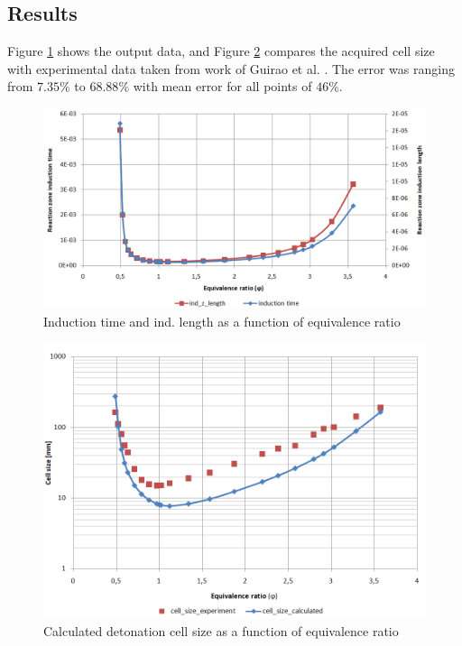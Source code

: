 \documentclass[a4paper]{article}
\begin{document}
\subsection{Results}

Figure \ref{fig:ind_t_and_l} shows the output data, and Figure \ref{fig:ZND_cell_size} compares the acquired cell size with experimental data taken from work of Guirao et al.\cite{Guirao} \cite{DetDat}. The error was ranging from $7.35\%$ to $68.88\%$ with mean error for all points of $46\%$.

\begin{figure}[h!]
\centering
\includegraphics[width=1\textwidth]{1_ind_time_AND_ind_zone_length_against_eq_ratio.PNG}
\caption{\label{fig:ind_t_and_l}Induction time and ind. length as a function of equivalence ratio}
\end{figure}

\begin{figure}[H]
\centering
\includegraphics[width=1\textwidth]{1_cell_size_against_phi.PNG}
\caption{\label{fig:ZND_cell_size}Calculated detonation cell size as a function of equivalence ratio}
\end{figure}
\end{document}
